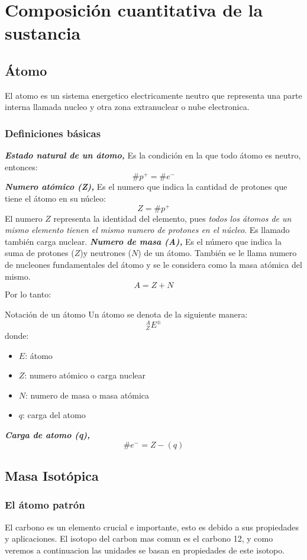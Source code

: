 \section{Composición cuantitativa de la sustancia}
\subsection*{Átomo}
El atomo es un sistema energetico electricamente neutro que representa una parte interna llamada nucleo y otra zona extranuclear o nube electronica.
\subsubsection*{Definiciones básicas}
\textbf{\textit{Estado natural de un átomo, }} Es la condición en la que todo átomo es neutro, entonces:
$$ \#p^+=\#e^- $$
\textbf{\textit{Numero atómico (Z), }} Es el numero que indica la cantidad de protones que tiene el átomo en su núcleo:
$$ Z=\#p^+ $$
El numero $Z$ representa la identidad del elemento, pues \textit{todos los átomos de un mismo elemento tienen el mismo numero de protones en el núcleo}. Es llamado también carga nuclear.
\textbf{\textit{Numero de masa (A), }} Es el número que indica la suma de protones ($Z$)y neutrones ($N$) de un átomo. También se le llama numero de nucleones fundamentales del átomo y se le considera como la masa atómica del mismo.
$$ A=Z+N $$
Por lo tanto:
\begin{Theorem*} {Notación de un átomo}
	Un átomo se denota de la siguiente manera:
	$$ ^A_Z E^\pm $$
	donde:
	\begin{itemize}
		\item $E$: átomo
		\item $Z$: numero atómico o carga nuclear
		\item $N$: numero de masa o masa atómica
		\item $q$: carga del atomo
	\end{itemize}
\end{Theorem*}
\textbf{\textit{Carga de atomo (q),}}
$$ \#e^-=Z-(q) $$
\subsection*{Masa Isotópica}
\subsubsection*{El átomo patrón}
El carbono es un elemento crucial e importante, esto es debido a sus propiedades y aplicaciones. El isotopo del carbon mas comun es el carbono 12, y como veremos a continuacion las unidades se basan en propiedades de este isotopo.
